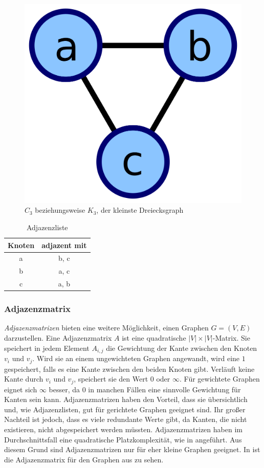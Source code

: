                \begin{figure}
                    \centering
                    \includegraphics[width=0.25\linewidth]{images/graph-adjacency.png}
                    \caption{$C_3$ beziehungsweise $K_3$, der kleinste Dreiecksgraph\\\cite{EZ:Web31}}
                    \label{fig:triangle}
                \end{figure}
                
                \begin{table}
                    \centering
                    \begin{tabular}{c|c}
                         Knoten & adjazent mit\\ \hline
                         a & b, c\\
                         b & a, c\\
                         c & a, b\\
                    \end{tabular}
                    \caption{Adjazenzliste}
                    \label{tab:adjacency-list}
                \end{table}
                
            \subsubsection{Adjazenzmatrix}
    
                \emph{Adjazenzmatrizen} bieten eine weitere Möglichkeit, einen Graphen $G = (V, E)$ darzustellen. Eine Adjazenzmatrix $A$ ist eine quadratische $|V| \times |V|$-Matrix. Sie speichert in jedem Element $A_{i,j}$ die Gewichtung der Kante zwischen den Knoten $v_i$ und $v_j$. Wird sie an einem ungewichteten Graphen angewandt, wird eine $1$ gespeichert, falls es eine Kante zwischen den beiden Knoten gibt. Verläuft keine Kante durch $v_i$ und $v_j$, speichert sie den Wert $0$ oder $\infty$. Für gewichtete Graphen eignet sich $\infty$ besser, da $0$ in manchen Fällen eine sinnvolle Gewichtung für Kanten sein kann. Adjazenzmatrizen haben den Vorteil, dass sie übersichtlich und, wie Adjazenzlisten, gut für gerichtete Graphen geeignet sind. Ihr großer Nachteil ist jedoch, dass es viele redundante Werte gibt, da Kanten, die nicht existieren, nicht abgespeichert werden müssten. Adjazenzmatrizen haben im Durchschnittsfall eine quadratische Platzkomplexität, wie in  angeführt. Aus diesem Grund sind Adjazenzmatrizen nur für eher kleine Graphen geeignet. In  ist die Adjazenzmatrix für den Graphen aus  zu sehen. \cite{EZ:Web36, EZ:Web37, EZ:Web41, EZ:Web42, EZ:Web43}
                
